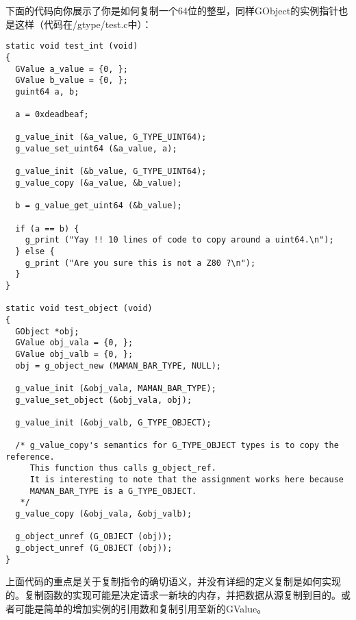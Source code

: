 下面的代码向你展示了你是如何复制一个64位的整型，同样GObject的实例指针也是这样（代码在/gtype/test.c中）：
\begin{verbatim}
static void test_int (void)
{
  GValue a_value = {0, };
  GValue b_value = {0, };
  guint64 a, b;

  a = 0xdeadbeaf;

  g_value_init (&a_value, G_TYPE_UINT64);
  g_value_set_uint64 (&a_value, a);

  g_value_init (&b_value, G_TYPE_UINT64);
  g_value_copy (&a_value, &b_value);

  b = g_value_get_uint64 (&b_value);

  if (a == b) {
    g_print ("Yay !! 10 lines of code to copy around a uint64.\n");
  } else {
    g_print ("Are you sure this is not a Z80 ?\n");
  }
}

static void test_object (void)
{
  GObject *obj;
  GValue obj_vala = {0, };
  GValue obj_valb = {0, };
  obj = g_object_new (MAMAN_BAR_TYPE, NULL);

  g_value_init (&obj_vala, MAMAN_BAR_TYPE);
  g_value_set_object (&obj_vala, obj);

  g_value_init (&obj_valb, G_TYPE_OBJECT);

  /* g_value_copy's semantics for G_TYPE_OBJECT types is to copy the reference.
     This function thus calls g_object_ref.
     It is interesting to note that the assignment works here because
     MAMAN_BAR_TYPE is a G_TYPE_OBJECT.
   */
  g_value_copy (&obj_vala, &obj_valb);

  g_object_unref (G_OBJECT (obj));
  g_object_unref (G_OBJECT (obj));
}
\end{verbatim}
上面代码的重点是关于复制指令的确切语义，并没有详细的定义复制是如何实现的。复制函数的实现可能是决定请求一新块的内存，并把数据从源复制到目的。或者可能是简单的增加实例的引用数和复制引用至新的GValue。

